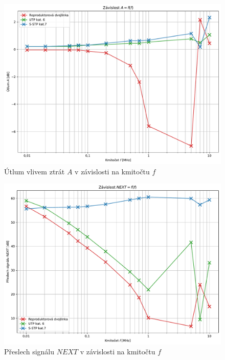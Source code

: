 \documentclass[a4paper, czech]{article}
\begin{document}
\begin{figure}[H]
    \centering
    \includegraphics[width=\textwidth]{grafy/graf1.pdf}
    \caption{Útlum vlivem ztrát $A$ v závislosti na kmitočtu $f$}
\end{figure}

\begin{figure}[H]
    \centering
    \includegraphics[width=\textwidth]{grafy/graf2.pdf}
    \caption{Přeslech signálu $NEXT$ v závislosti na kmitočtu $f$}
\end{figure}
\end{document}
